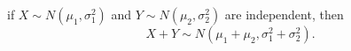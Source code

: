 %
%
%


\begin{theorem}\label{thm:sum_of_normal_variables}
if $X\sim N(\mu_1,\sigma_1^2)$ and $Y\sim N(\mu_2,\sigma_2^2)$ are independent, then
\[
X+Y\sim N(\mu_1+\mu_2, \sigma_1^2+\sigma_2^2).
\]
\end{theorem}
\proofomitted

